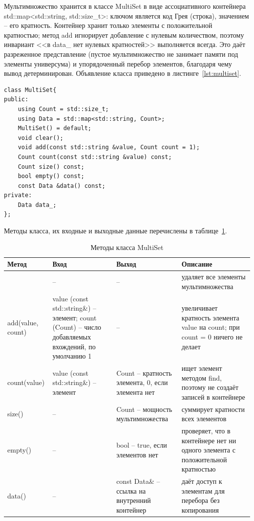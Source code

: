 \documentclass[14pt,a4paper]{extreport}
\newcommand{\code}[1]{{\ttfamily #1}}
\begin{document}
Мультимножество хранится в классе \code{MultiSet} в виде ассоциативного контейнера \code{std::map<std::string, std::size\_t>}: ключом является код Грея (строка), значением -- его кратность. Контейнер хранит только элементы с положительной кратностью; метод \code{add} игнорирует добавление с нулевым количеством, поэтому инвариант <<в \code{data\_} нет нулевых кратностей>> выполняется всегда. Это даёт разреженное представление (пустое мультимножество не занимает памяти под элементы универсума) и упорядоченный перебор элементов, благодаря чему вывод детерминирован. Объявление класса приведено в листинге~\ref{lst:multiset}.

\begin{listing}[H]
\caption{Объявление класса MultiSet (multiset.hpp)}\label{lst:multiset}
\begin{lstlisting}
class MultiSet{
public:
    using Count = std::size_t;
    using Data = std::map<std::string, Count>;
    MultiSet() = default;
    void clear();
    void add(const std::string &value, Count count = 1);
    Count count(const std::string &value) const;
    Count size() const;
    bool empty() const;
    const Data &data() const;
private:
    Data data_;
};
\end{lstlisting}
\end{listing}
\vspace{-0.7cm}
Методы класса, их входные и выходные данные перечислены в таблице~\ref{tab:msmethods}.
\begin{table}[H]
\caption{Методы класса MultiSet}\label{tab:msmethods}
\small\singlespacing
\begin{tabularx}{\textwidth}{@{}>{\raggedright\arraybackslash}p{3.3cm}>{\raggedright\arraybackslash}p{4.3cm}>{\raggedright\arraybackslash}p{3.4cm}X@{}}
\toprule
Метод & Вход & Выход & Описание \\
\midrule
\code{clear()} & -- & -- & удаляет все элементы мультимножества \\ \hline
\code{add(value, count)} & \code{value} (\code{const std::string\&}) -- элемент; \code{count} (\code{Count}) -- число добавляемых вхождений, по умолчанию 1 & -- & увеличивает кратность элемента \code{value} на \code{count}; при \code{count = 0} ничего не делает \\ \hline
\code{count(value)} & \code{value} (\code{const std::string\&}) -- элемент & \code{Count} -- кратность элемента, 0, если элемента нет & ищет элемент методом \code{find}, поэтому не создаёт записей в контейнере \\ \hline
\code{size()} & -- & \code{Count} -- мощность мультимножества & суммирует кратности всех элементов \\ \hline
\code{empty()} & -- & \code{bool} -- \code{true}, если элементов нет & проверяет, что в контейнере нет ни одного элемента с положительной кратностью \\ \hline
\code{data()} & -- & \code{const Data\&} -- ссылка на внутренний контейнер & даёт доступ к элементам для перебора без копирования \\
\bottomrule
\end{tabularx}
\end{table}
\end{document}
